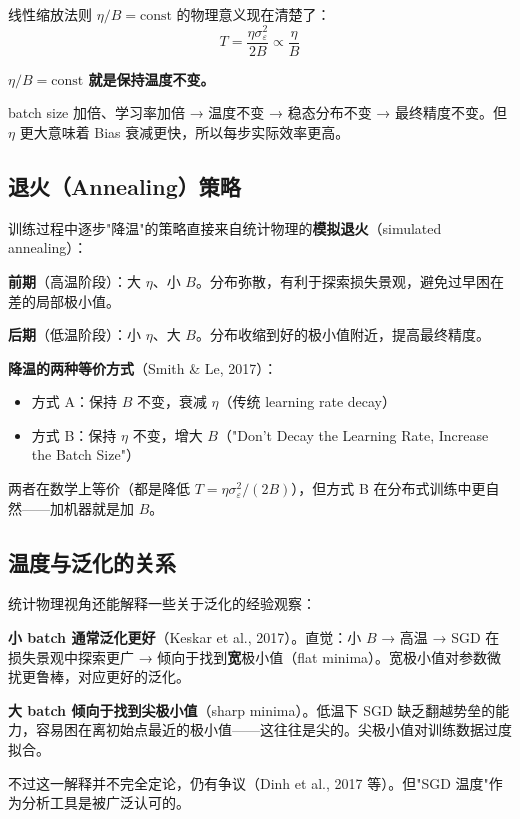 \documentclass[12pt, a4paper]{ctexart}
\begin{document}
线性缩放法则 $\eta/B = \text{const}$ 的物理意义现在清楚了：
\begin{equation}
    T = \frac{\eta\sigma_\varepsilon^2}{2B} \propto \frac{\eta}{B}
\end{equation}

\textbf{$\eta/B = \text{const}$ 就是保持温度不变。}

batch size 加倍、学习率加倍 → 温度不变 → 稳态分布不变 → 最终精度不变。但 $\eta$ 更大意味着 Bias 衰减更快，所以每步实际效率更高。

\subsection{退火（Annealing）策略}

训练过程中逐步"降温"的策略直接来自统计物理的\textbf{模拟退火}（simulated annealing）：

\textbf{前期}（高温阶段）：大 $\eta$、小 $B$。分布弥散，有利于探索损失景观，避免过早困在差的局部极小值。

\textbf{后期}（低温阶段）：小 $\eta$、大 $B$。分布收缩到好的极小值附近，提高最终精度。

\textbf{降温的两种等价方式}（Smith \& Le, 2017）：
\begin{itemize}
    \item 方式 A：保持 $B$ 不变，衰减 $\eta$（传统 learning rate decay）
    \item 方式 B：保持 $\eta$ 不变，增大 $B$（"Don't Decay the Learning Rate, Increase the Batch Size"）
\end{itemize}

两者在数学上等价（都是降低 $T = \eta\sigma_\varepsilon^2/(2B)$），但方式 B 在分布式训练中更自然——加机器就是加 $B$。

\subsection{温度与泛化的关系}

统计物理视角还能解释一些关于泛化的经验观察：

\textbf{小 batch 通常泛化更好}（Keskar et al., 2017）。直觉：小 $B$ → 高温 → SGD 在损失景观中探索更广 → 倾向于找到\textbf{宽}极小值（flat minima）。宽极小值对参数微扰更鲁棒，对应更好的泛化。

\textbf{大 batch 倾向于找到尖极小值}（sharp minima）。低温下 SGD 缺乏翻越势垒的能力，容易困在离初始点最近的极小值——这往往是尖的。尖极小值对训练数据过度拟合。

不过这一解释并不完全定论，仍有争议（Dinh et al., 2017 等）。但"SGD 温度"作为分析工具是被广泛认可的。
\end{document}
